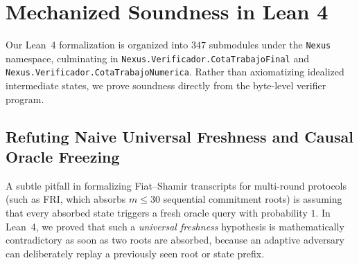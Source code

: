 \documentclass[conference]{IEEEtran}
\theoremstyle{definition}
\begin{document}
\section{Mechanized Soundness in Lean 4}
\label{sec:lean}

Our Lean~4 formalization is organized into $347$ submodules under the \texttt{Nexus} namespace, culminating in \texttt{Nexus.Verificador.CotaTrabajoFinal} and \texttt{Nexus.Verificador.CotaTrabajoNumerica}. Rather than axiomatizing idealized intermediate states, we prove soundness directly from the byte-level verifier program.

\subsection{Refuting Naive Universal Freshness and Causal Oracle Freezing}
A subtle pitfall in formalizing Fiat--Shamir transcripts for multi-round protocols (such as FRI, which absorbs $m \le 30$ sequential commitment roots) is assuming that every absorbed state triggers a fresh oracle query with probability $1$. In Lean~4, we proved that such a \emph{universal freshness} hypothesis is mathematically contradictory as soon as two roots are absorbed, because an adaptive adversary can deliberately replay a previously seen root or state prefix.
\end{document}
